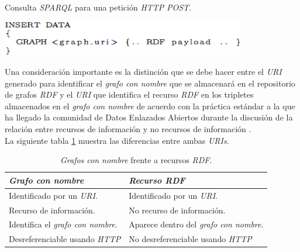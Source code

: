 \begin{table}
\vspace{2.4in}
\caption{Consulta \textit{SPARQL} para una petici\'on \textit{HTTP} \textit{POST}.}
\includegraphics[width=0.8\textwidth]{tabla7}
\label{tabla7}
\end{table}

Una consideraci\'on importante es la distinci\'on que se debe hacer entre el \textit{URI} generado para identificar el \textit{grafo con nombre} que se almacenar\'a en el repositorio de grafos \textit{RDF} y el \textit{URI} que identifica el recurso \textit{RDF} en los tripletes almacenados en el \textit{grafo con nombre} de acuerdo con la pr\'actica est\'andar a la que ha llegado la comunidad de Datos Enlazados Abiertos durante la discusi\'on de la relaci\'on entre recursos de informaci\'on y no recursos de informaci\'on \cite{fielding2005httprange}.\\
La siguiente tabla \ref{named_graph_vs_resource_uri} muestra las diferencias entre ambas \textit{URIs}.\\

\begin{table}
\centering
\caption{\textit{Grafos con nombre} frente a recursos \textit{RDF}.}
\label{named_graph_vs_resource_uri}
\begin{center}
\begin{tabular}{|l|l|}\hline
\textbf{\textit{Grafo con nombre}} & \textbf{\textit{Recurso RDF}} \\\hline
Identificado por un \textit{URI}. & Identificado por un \textit{URI}. \\
Recurso de informaci\'on. & No recurso de informaci\'on.\\
Identifica el \textit{grafo con nombre}. & Aparece dentro del \textit{grafo con nombre}.\\
Desreferenciable usando \textit{HTTP} & No desreferenciable usando \textit{HTTP}\\\hline
\end{tabular}
\end{center}
\end{table}


